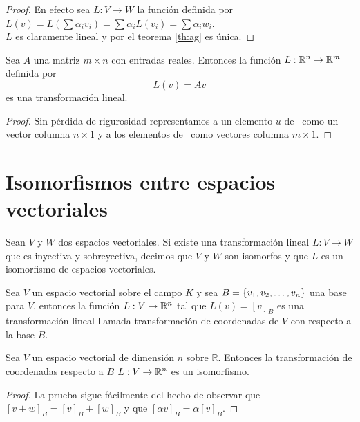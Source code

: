 \begin{proof}
En efecto sea $L: V \to W$ la función definida por $L(v) = L(\sum \alpha_i v_i) = \sum \alpha_i L(v_i) = \sum \alpha_i w_i$.
\\

$L$ es claramente lineal y por el teorema \ref{th:ag} es única.
\end{proof}

\begin{theorem}
Sea $A$ una matriz $m \times n$ con entradas reales. Entonces la función $L : \mathbb{R}^n \to \mathbb{R}^m $ definida por $$L(v)= A v$$
es una transformación lineal.
\end{theorem}

\begin{proof}
Sin pérdida de rigurosidad representamos a un elemento $u$ de \rn \ como un vector columna $n \times 1$ y a los elementos de \rmm \ como vectores columna $m \times 1$.
\end{proof}

\section{Isomorfismos entre espacios vectoriales}
\begin{dfn}
Sean $V$ y $W$ dos espacios vectoriales. Si existe una transformación lineal $L : V \to W$ que es inyectiva y sobreyectiva, decimos que $V$ y $W$ son isomorfos y que $L$ es un isomorfismo de espacios vectoriales.
\end{dfn}

\begin{dfn}
Sea $V$ un espacio vectorial sobre el campo $K$ y sea $B =  \lbrace v_1, v_2, \ldots, v_n \rbrace$ una base para $V$, entonces la función $L : V \to \mathbb{R}^n$ tal que $L(v) = [v]_B$ es una transformación lineal llamada transformación de coordenadas de $V$ con respecto a la base $B$.
\end{dfn}

\begin{theorem}
Sea $V$ un espacio vectorial de dimensión $n$ sobre $\mathbb{R}$. Entonces la transformación de coordenadas respecto a $B$ $L : V \to \mathbb{R}^n$ es un isomorfismo.
\end{theorem}

\begin{proof}
La prueba sigue fácilmente del hecho de observar que $[v + w]_B = [v]_B + [w]_B$ y que $[\alpha v]_B = \alpha [v]_B$.
\end{proof}

